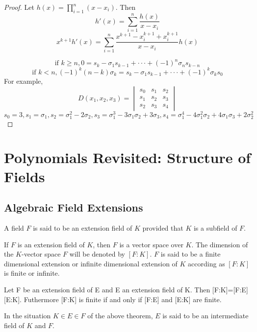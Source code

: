\begin{theorem}

\end{theorem}
\begin{proof}
Let $h(x)=\prod_{i=1}^{n}(x-x_i)$. Then \[h'(x)=\sum_{i=1}^{n} \frac{h(x)}{x-x_i}\]
\[x^{k+1}h'(x)=\sum_{i=1}^{n}\frac{x^{k+1}-x_i^{k+1}+x_i^{k+1}}{x-x_i}h(x)\]


\[\text{if } k\ge n, 0=s_k-\sigma_1s_{k-1}+\cdot \cdot \cdot +(-1)^n\sigma_ns_{k-n}\]
\[\text{if } k<n, (-1)^k(n-k)\sigma_k=s_k-\sigma_1s_{k-1}+\cdot \cdot \cdot +(-1)^k\sigma_ks_0\]
For example,\[D(x_1,x_2,x_3)=\begin{vmatrix}
  s_0& s_1 & s_2\\
  s_1& s_2 &s_3 \\
  s_2& s_3 &s_4
\end{vmatrix}
\]
\[s_0=3,s_1=\sigma_1,s_2=\sigma_1^2-2\sigma_2,s_3=\sigma_1^3-3\sigma_1
\sigma_2+3\sigma_3,s_4=\sigma_1^4-4\sigma_1^2\sigma_2+4\sigma_1\sigma_3
+2\sigma_2^2\]

\end{proof}


\section{Polynomials Revisited: Structure of Fields}
\subsection{Algebraic Field Extensions}
\begin{definition}
A field $F$ is said to be an extension field of $K$ provided that $K$ is a subfield of $F$.
\end{definition}
If $F$ is an extension field of $K$, then $F$ is a vector space over $K$. The dimension of the $K$-vector space $F$ will be denoted by $[F:K]$. $F$ is said to be a finite dimensional extension or infinite dimensional extension of $K$ according as $[F:K]$ is finite or infinite.
\begin{theorem}
Let F be an extension field of E and E an extension field of K. Then [F:K]=[F:E][E:K]. Futhermore [F:K] is finite if and only if [F:E] and [E:K] are finite.
\end{theorem}
In the situation $K\in E\in F$ of the above theorem, $E$ is said to be an intermediate field of $K$ and $F$.


